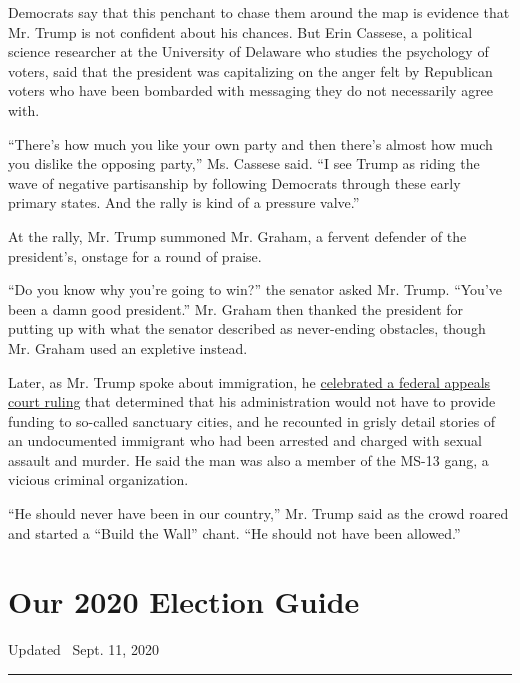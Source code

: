 Democrats say that this penchant to chase them around the map is
evidence that Mr. Trump is not confident about his chances. But Erin
Cassese, a political science researcher at the University of Delaware
who studies the psychology of voters, said that the president was
capitalizing on the anger felt by Republican voters who have been
bombarded with messaging they do not necessarily agree with.

``There's how much you like your own party and then there's almost how
much you dislike the opposing party,'' Ms. Cassese said. ``I see Trump
as riding the wave of negative partisanship by following Democrats
through these early primary states. And the rally is kind of a pressure
valve.''

At the rally, Mr. Trump summoned Mr. Graham, a fervent defender of the
president's, onstage for a round of praise.

``Do you know why you're going to win?'' the senator asked Mr. Trump.
``You've been a damn good president.'' Mr. Graham then thanked the
president for putting up with what the senator described as never-ending
obstacles, though Mr. Graham used an expletive instead.

Later, as Mr. Trump spoke about immigration, he
\href{https://www.nytimes3xbfgragh.onion/2020/02/26/nyregion/sanctuary-cities-funding.html}{celebrated
a federal appeals court ruling} that determined that his administration
would not have to provide funding to so-called sanctuary cities, and he
recounted in grisly detail stories of an undocumented immigrant who had
been arrested and charged with sexual assault and murder. He said the
man was also a member of the MS-13 gang, a vicious criminal
organization.

``He should never have been in our country,'' Mr. Trump said as the
crowd roared and started a ``Build the Wall'' chant. ``He should not
have been allowed.''

\hypertarget{our-2020-election-guide}{%
\section{Our 2020 Election Guide}\label{our-2020-election-guide}}

Updated ~Sept. 11, 2020

\begin{center}\rule{0.5\linewidth}{\linethickness}\end{center}

